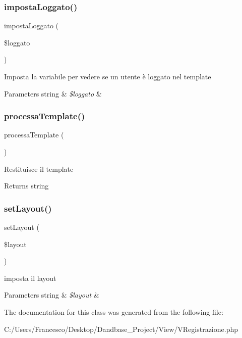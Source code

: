 \subsubsection{\texorpdfstring{imposta\+Loggato()}{impostaLoggato()}}
{\footnotesize\ttfamily imposta\+Loggato (\begin{DoxyParamCaption}\item[{}]{\$loggato }\end{DoxyParamCaption})}

Imposta la variabile per vedere se un utente è loggato nel template


\begin{DoxyParams}[1]{Parameters}
string & {\em \$loggato} & \\
\hline
\end{DoxyParams}
\mbox{\label{class_v_registrazione_a64bdc484fc7074989b4b2c0ebc63aec2}} 
\subsubsection{\texorpdfstring{processa\+Template()}{processaTemplate()}}
{\footnotesize\ttfamily processa\+Template (\begin{DoxyParamCaption}{ }\end{DoxyParamCaption})}

Restituisce il template

\begin{DoxyReturn}{Returns}
string 
\end{DoxyReturn}
\mbox{\label{class_v_registrazione_a702b3376618a26e6c02c05bae65c6b9e}} 
\subsubsection{\texorpdfstring{set\+Layout()}{setLayout()}}
{\footnotesize\ttfamily set\+Layout (\begin{DoxyParamCaption}\item[{}]{\$layout }\end{DoxyParamCaption})}

imposta il layout


\begin{DoxyParams}[1]{Parameters}
string & {\em \$layout} & \\
\hline
\end{DoxyParams}


The documentation for this class was generated from the following file\+:\begin{DoxyCompactItemize}
\item 
C\+:/\+Users/\+Francesco/\+Desktop/\+Dandbase\+\_\+\+Project/\+View/V\+Registrazione.\+php\end{DoxyCompactItemize}
